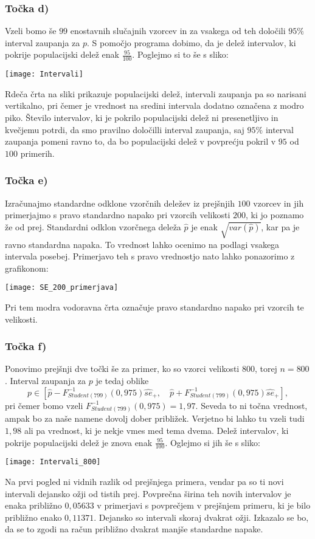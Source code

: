 \documentclass[12pt, letterpaper]{article}
\begin{document}
\subsubsection*{Točka d)} Vzeli bomo še $99$ enostavnih slučajnih vzorcev in za vsakega od teh določili $95\%$ interval zaupanja za $p$. S pomočjo programa dobimo, da je delež intervalov, ki pokrije populacijski delež enak $\frac{95}{100}$. Poglejmo si to še s sliko:
\begin{center}
\texttt{[image: Intervali]}
\end{center}
Rdeča črta na sliki prikazuje populacijski delež, intervali zaupanja pa so narisani vertikalno, pri čemer je vrednost na sredini intervala dodatno označena z modro piko. Število intervalov, ki je pokrilo populacijski delež ni presenetljivo in kvečjemu potrdi, da smo pravilno določilli interval zaupanja, saj $95\%$ interval zaupanja pomeni ravno to, da bo populacijski delež v povprećju pokril v $95$ od $100$ primerih.

\subsubsection*{Točka e)} Izračunajmo standardne odklone vzorčnih deležev iz prejšnjih $100$ vzorcev in jih primerjajmo s pravo standardno napako pri vzorcih velikosti $200$, ki jo poznamo že od prej. Standardni odklon vzorčnega deleža $\hat{p}$ je enak $\sqrt{var(\hat{p})}$, kar pa je ravno standardna napaka. To vrednost lahko ocenimo na podlagi vsakega intervala posebej. Primerjavo teh s pravo vrednostjo nato lahko ponazorimo z grafikonom:
\begin{center}
\texttt{[image: SE\_200\_primerjava]}
\end{center}
Pri tem modra vodoravna črta označuje pravo standardno napako pri vzorcih te velikosti.

\subsubsection*{Točka f)} Ponovimo prejšnji dve točki še za primer, ko so vzorci velikosti $800$, torej $n = 800$. Interval zaupanja za $p$ je tedaj oblike
\[
p \in \left[\hat{p} - F_{Student(799)}^{-1}(0,975)\hat{se}_+, \quad \hat{p} + F_{Student(799)}^{-1}(0,975)\hat{se}_+\right],
\]
pri čemer bomo vzeli $F_{Student(799)}^{-1}(0,975) = 1,97$. Seveda to ni točna vrednost, ampak bo za naše namene dovolj dober približek. Verjetno bi lahko tu vzeli tudi $1,98$ ali pa vrednost, ki je nekje vmes med tema dvema.
Delež intervalov, ki pokrije populacijski delež je znova enak $\frac{95}{100}$. Oglejmo si jih še s sliko:
\begin{center}
\texttt{[image: Intervali\_800]}
\end{center}
Na prvi pogled ni vidnih razlik od prejšnjega primera, vendar pa so ti novi intervali dejansko ožji od tistih prej. Povprečna širina teh novih intervalov je enaka približno $0,05633$ v primerjavi s povprečjem v prejšnjem primeru, ki je bilo približno enako $0,11371$. Dejansko so intervali skoraj dvakrat ožji. Izkazalo se bo, da se to zgodi na račun približno dvakrat manjše standardne napake.
\end{document}
